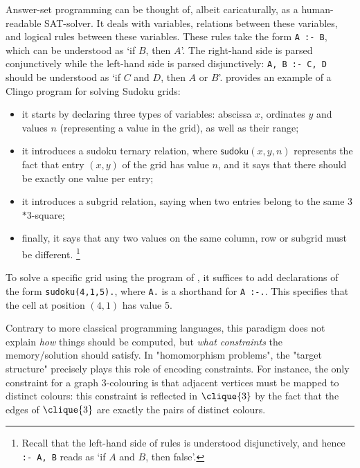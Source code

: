 Answer-set programming can be thought of, albeit caricaturally, as a human-readable
SAT-solver. It deals with variables, relations between these variables,
and logical rules between these variables. These rules take the form
\lstinline[language=myclingo]|A :- B|, which can be understood as `if $B$, then $A$'.
The right-hand side is parsed conjunctively while the left-hand side is parsed disjunctively:
\lstinline[language=myclingo]|A, B :- C, D| should be understood as `if $C$ and $D$, then $A$ or $B$'.
 provides
an example of a Clingo program for solving Sudoku grids:
\begin{itemize}
	\item it starts by declaring three types of variables: abscissa $x$, ordinates $y$ and values $n$ (representing a value in the grid), as well as their range;
	\item it introduces a \textsf{sudoku} ternary relation, where $\textsf{sudoku}(x,y,n)$
		represents the fact that entry $(x,y)$ of the grid has value $n$,
		and it says that there should be exactly one value per entry;
	\item it introduces a \textsf{subgrid} relation, saying when two entries
		belong to the same 3$\ast$3-square;
	\item finally, it says that any two values on the same column, row or subgrid
		must be different.%
		\footnote{Recall that the left-hand side of rules is understood disjunctively,
		and hence \lstinline[language=myclingo]|:- A, B| reads as `if $A$ and $B$, then false'.}
\end{itemize}
To solve a specific grid using the program of ,
it suffices to add declarations of the form \lstinline[language=myclingo]|sudoku(4,1,5).|,
where \lstinline[language=myclingo]|A.| is a shorthand for \lstinline[language=myclingo]|A :-.|.
This specifies that the cell at position $(4,1)$ has value 5.

Contrary to more classical programming languages, this paradigm does not explain \emph{how} things
should be computed, but \emph{what constraints} the memory/solution should satisfy.
In "homomorphism problems", the "target structure" precisely plays this role of
encoding constraints. For instance, the only constraint for a graph $3$-colouring is that
adjacent vertices must be mapped to distinct colours: this constraint is
reflected in $\clique{3}$ by the fact that the edges of $\clique{3}$ are exactly the pairs
of distinct colours.

